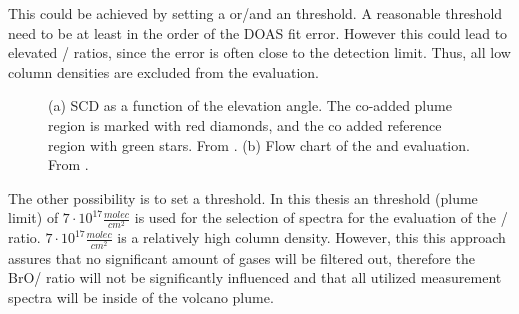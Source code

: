 This could be achieved by setting a  or/and an  threshold. A reasonable  threshold need to be at least in the order of the DOAS fit error. However this could lead to elevated / ratios, since the  error is often close to the detection limit. Thus, all low  column densities are excluded from the evaluation.
%
\begin{figure}
	\caption{(a)  SCD as a function of the elevation angle. The co-added plume region is marked with red diamonds, and the co added reference region with green stars. From \cite{WarnachSimon}. (b) Flow chart of the   and  evaluation. From \cite{lubcke2014optical}.}
	\label{fig:algorithm}
\end{figure}
The other possibility is to set a  threshold. In this thesis an  threshold (plume limit) of $7\cdot 10^{17} \frac{molec}{cm^2}$ is used for the selection of spectra for the evaluation of the / ratio. $7\cdot 10^{17} \frac{molec}{cm^2}$ is a relatively high column density. However, this this approach assures that no significant amount of gases will be filtered out, therefore the BrO/ ratio will not be significantly influenced \citep{lubcke2014bro} and that all utilized measurement spectra will be inside of the volcano plume. \\
